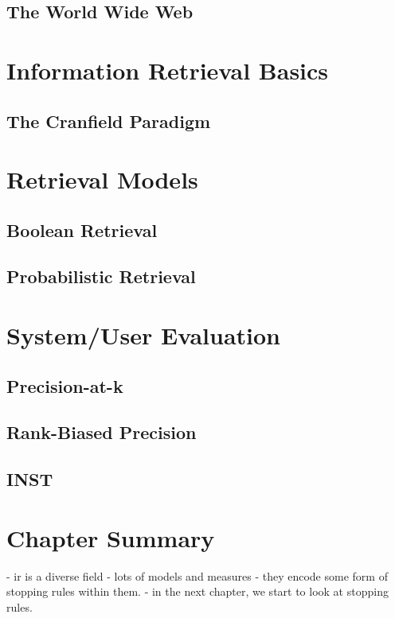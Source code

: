 \subsection{The World Wide Web}

\section{Information Retrieval Basics}

\subsection{The Cranfield Paradigm}

\section{Retrieval Models}

\subsection{Boolean Retrieval}

\subsection{Probabilistic Retrieval}

\section{System/User Evaluation}

\subsection{Precision-at-k}

\subsection{Rank-Biased Precision}

\subsection{INST}


\section{Chapter Summary}
- ir is a diverse field
- lots of models and measures
    - they encode some form of stopping rules within them.
    - in the next chapter, we start to look at stopping rules.


